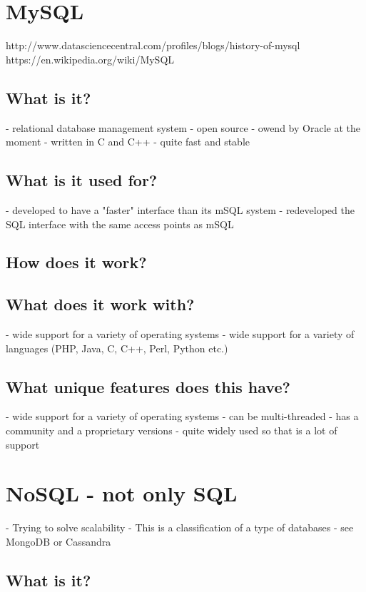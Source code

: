 \chapter{MySQL}
http://www.datasciencecentral.com/profiles/blogs/history-of-mysql
https://en.wikipedia.org/wiki/MySQL

\section{What is it?}
- relational database management system
- open source
- owend by Oracle at the moment
- written in C and C++
- quite fast and stable

\section{What is it used for?}
- developed to have a "faster" interface than its mSQL system
- redeveloped the SQL interface with the same access points as mSQL

\section{How does it work?}

\section{What does it work with?}
- wide support for a variety of operating systems
- wide support for a variety of languages (PHP, Java, C, C++, Perl, Python etc.)

\section{What unique features does this have?}
- wide support for a variety of operating systems
- can be multi-threaded
- has a community and a proprietary versions
- quite widely used so that is a lot of support

\chapter{NoSQL - not only SQL}
- Trying to solve scalability
- This is a classification of a type of databases - see MongoDB or Cassandra

\section{What is it?}

